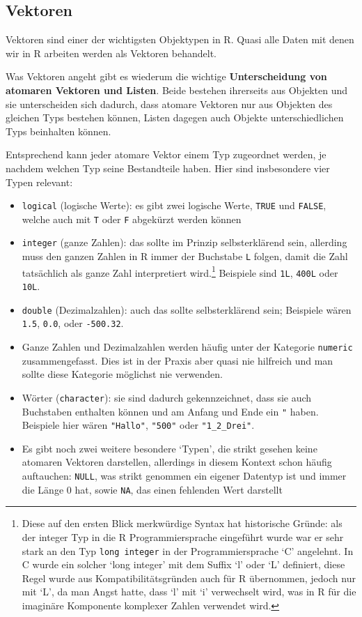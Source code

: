 \documentclass[]{book}
\providecommand{\tightlist}{%
  \setlength{\itemsep}{0pt}\setlength{\parskip}{0pt}}
\let\rmarkdownfootnote\footnote%
\def\footnote{\protect\rmarkdownfootnote}
\begin{document}
\subsection{Vektoren}\label{vektoren}

Vektoren sind einer der wichtigsten Objektypen in R. Quasi alle Daten
mit denen wir in R arbeiten werden als Vektoren behandelt.

Was Vektoren angeht gibt es wiederum die wichtige \textbf{Unterscheidung
von atomaren Vektoren und Listen}. Beide bestehen ihrerseits aus
Objekten und sie unterscheiden sich dadurch, dass atomare Vektoren nur
aus Objekten des gleichen Typs bestehen können, Listen dagegen auch
Objekte unterschiedlichen Typs beinhalten können.

Entsprechend kann jeder atomare Vektor einem Typ zugeordnet werden, je
nachdem welchen Typ seine Bestandteile haben. Hier sind insbesondere
vier Typen relevant:

\begin{itemize}
\tightlist
\item
  \texttt{logical} (logische Werte): es gibt zwei logische Werte,
  \texttt{TRUE} und \texttt{FALSE}, welche auch mit \texttt{T} oder
  \texttt{F} abgekürzt werden können
\item
  \texttt{integer} (ganze Zahlen): das sollte im Prinzip selbsterklärend
  sein, allerding muss den ganzen Zahlen in R immer der Buchstabe
  \texttt{L} folgen, damit die Zahl tatsächlich als ganze Zahl
  interpretiert wird.\footnote{Diese auf den ersten Blick merkwürdige
    Syntax hat historische Gründe: als der integer Typ in die R
    Programmiersprache eingeführt wurde war er sehr stark an den Typ
    \texttt{long\ integer} in der Programmiersprache `C' angelehnt. In C
    wurde ein solcher `long integer' mit dem Suffix `l' oder `L'
    definiert, diese Regel wurde aus Kompatibilitätsgründen auch für R
    übernommen, jedoch nur mit `L', da man Angst hatte, dass `l' mit `i'
    verwechselt wird, was in R für die imaginäre Komponente komplexer
    Zahlen verwendet wird.} Beispiele sind \texttt{1L}, \texttt{400L}
  oder \texttt{10L}.\\
\item
  \texttt{double} (Dezimalzahlen): auch das sollte selbsterklärend sein;
  Beispiele wären \texttt{1.5}, \texttt{0.0}, oder \texttt{-500.32}.
\item
  Ganze Zahlen und Dezimalzahlen werden häufig unter der Kategorie
  \texttt{numeric} zusammengefasst. Dies ist in der Praxis aber quasi
  nie hilfreich und man sollte diese Kategorie möglichst nie verwenden.
\item
  Wörter (\texttt{character}): sie sind dadurch gekennzeichnet, dass sie
  auch Buchstaben enthalten können und am Anfang und Ende ein \texttt{"}
  haben. Beispiele hier wären \texttt{"Hallo"}, \texttt{"500"} oder
  \texttt{"1\_2\_Drei"}.
\item
  Es gibt noch zwei weitere besondere `Typen', die strikt gesehen keine
  atomaren Vektoren darstellen, allerdings in diesem Kontext schon
  häufig auftauchen: \texttt{NULL}, was strikt genommen ein eigener
  Datentyp ist und immer die Länge 0 hat, sowie \texttt{NA}, das einen
  fehlenden Wert darstellt
\end{itemize}
\end{document}
